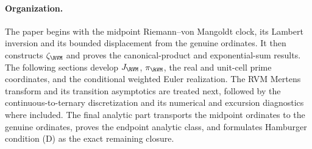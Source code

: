 \paragraph{Organization.}
The paper begins with the midpoint Riemann--von Mangoldt clock, its Lambert
inversion and its bounded displacement from the genuine ordinates.  It then
constructs $\zeta_{\RVM}$ and proves the canonical-product and exponential-sum
results.  The following sections develop $J_{\RVM}$, $\pi_{\RVM}$, the real and
unit-cell prime coordinates, and the conditional weighted Euler realization.
The RVM Mertens transform and its transition asymptotics are treated next,
followed by the continuous-to-ternary discretization and its numerical and
excursion diagnostics where included.  The final analytic part transports the
midpoint ordinates to the genuine ordinates, proves the endpoint analytic
class, and formulates Hamburger condition (D) as the exact remaining closure.
